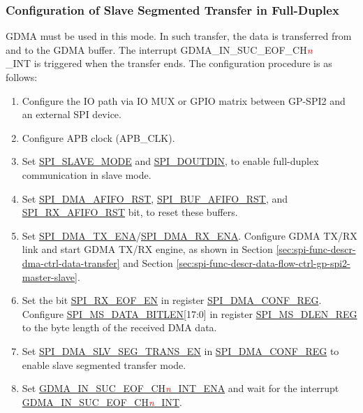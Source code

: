 \documentclass[main\_\_EN.tex]{subfiles}
\begin{document}
\subsubsection{Configuration of Slave Segmented Transfer in Full-Duplex}\label{sec:spi-config-slave-seg-trans-full-duplex}
GDMA must be used in this mode. In such transfer, the data is transferred from and to the GDMA buffer. The interrupt GDMA\_IN\_SUC\_EOF\_CH\textcolor{red}{\it{n}}\\\_INT is triggered when the transfer ends. The configuration procedure is as follows:

\begin{enumerate}
   \item Configure the IO path via IO MUX or GPIO matrix between GP-SPI2 and an external SPI device.
   \item Configure APB clock (APB\_CLK).

    \item Set \hyperref[fielddesc:SPISLAVEMODE]{SPI\_SLAVE\_MODE} and \hyperref[fielddesc:SPIDOUTDIN]{SPI\_DOUTDIN}, to enable full-duplex communication in slave mode.

    \item Set \hyperref[fielddesc:SPIDMAAFIFORST]{SPI\_DMA\_AFIFO\_RST}, \hyperref[fielddesc:SPIBUFAFIFORST]{SPI\_BUF\_AFIFO\_RST}, and \hyperref[fielddesc:SPIRXAFIFORST]{SPI\_RX\_AFIFO\_RST} bit, to reset these buffers.

    \item Set \hyperref[fielddesc:SPIDMATXENA]{SPI\_DMA\_TX\_ENA}/\hyperref[fielddesc:SPIDMARXENA]{SPI\_DMA\_RX\_ENA}. Configure GDMA TX/RX link and start GDMA TX/RX engine, as shown in Section \ref{sec:spi-func-descr-dma-ctrl-data-transfer} and Section \ref{sec:spi-func-descr-data-flow-ctrl-gp-spi2-master-slave}.

    \item Set the bit \hyperref[fielddesc:SPIRXEOFEN]{SPI\_RX\_EOF\_EN} in register \hyperref[regdesc:SPIDMACONFREG]{SPI\_DMA\_CONF\_REG}. Configure \hyperref[fielddesc:SPIMSDATABITLEN]{SPI\_MS\_DATA\_BITLEN}[17:0] in register \hyperref[regdesc:SPIMSDLENREG]{SPI\_MS\_DLEN\_REG} to the byte length of the received DMA data.

    \item Set \hyperref[fielddesc:SPIDMASLVSEGTRANSEN]{SPI\_DMA\_SLV\_SEG\_TRANS\_EN} in \hyperref[regdesc:SPIDMACONFREG]{SPI\_DMA\_CONF\_REG} to enable slave segmented transfer mode.

    \item Set \hyperref[fielddesc:GDMAINSUCEOFCHNINTENA]{GDMA\_IN\_SUC\_EOF\_CH\textcolor{red}{\it{n}}\_INT\_ENA} and wait for the interrupt \hyperref[int:GDMAINSUCEOFINT]{GDMA\_IN\_SUC\_EOF\_CH\textcolor{red}{\it{n}}\_INT}.
\end{enumerate}
\end{document}
